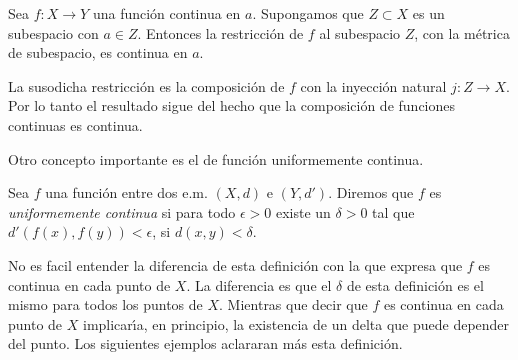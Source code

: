\begin{corolario} Sea $f:X\rightarrow Y$ una funci\'on continua
en $a$. Supongamos que $Z\subset X$ es un subespacio con $a\in Z$.
Entonces la restricci\'on de $f$ al subespacio $Z$, con la
m\'etrica de subespacio, es continua en $a$.
\end{corolario}
\begin{demo} La susodicha restricci\'on es la composici\'on de $f$
con la inyecci\'on natural $j:Z\rightarrow X$. Por lo tanto el
resultado sigue del hecho que la composici\'on de funciones
continuas es continua.
\end{demo}

Otro concepto importante es el de funci\'on uniformemente
continua.

\begin{definicion} Sea $f$ una funci\'on entre dos e.m. $(X,d)$ e $(Y,d')$.
Diremos que $f$ es \emph{uniformemente continua} si para todo
$\epsilon>0$ existe un $\delta>0$ tal que
$d'(f(x),f(y))<\epsilon$, si $d(x,y)<\delta$.
\end{definicion}

No es facil entender la diferencia de esta definici\'on con la que
expresa que $f$ es continua en cada punto de $X$. La diferencia es
que el $\delta$ de esta definici\'on es el mismo para todos los
puntos de $X$. Mientras que decir que $f$ es continua en cada
punto de $X$ implicar\'{\i}a, en principio, la existencia de un
delta  que puede depender del punto. Los siguientes ejemplos
aclararan m\'as esta definici\'on.

